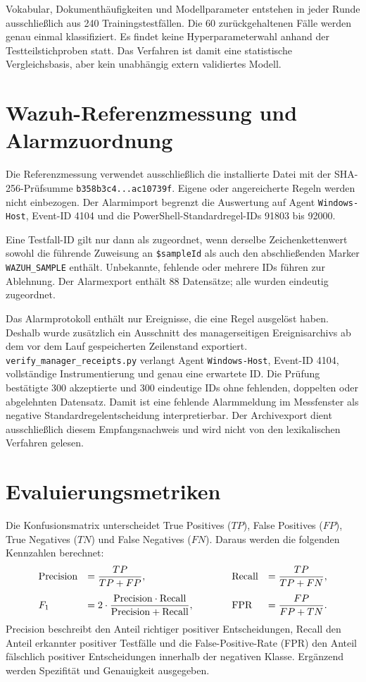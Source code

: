\documentclass[12pt,a4paper,oneside,parskip=half]{scrreprt}
\begin{document}
Vokabular, Dokumenthäufigkeiten und Modellparameter entstehen in jeder Runde ausschließlich aus 240 Trainingstestfällen. Die 60 zurückgehaltenen Fälle werden genau einmal klassifiziert. Es findet keine Hyperparameterwahl anhand der Testteilstichproben statt. Das Verfahren ist damit eine statistische Vergleichsbasis, aber kein unabhängig extern validiertes Modell.
\section{Wazuh-Referenzmessung und Alarmzuordnung}
Die Referenzmessung verwendet ausschließlich die installierte Datei  mit der SHA-256-Prüfsumme \texttt{b358b3c4...ac10739f}. Eigene oder angereicherte Regeln werden nicht einbezogen. Der Alarmimport begrenzt die Auswertung auf Agent \texttt{Windows-Host}, Event-ID 4104 und die PowerShell-Standardregel-IDs 91803 bis 92000.

Eine Testfall-ID gilt nur dann als zugeordnet, wenn derselbe Zeichenkettenwert sowohl die führende Zuweisung an \texttt{\$sampleId} als auch den abschließenden Marker \texttt{WAZUH\_SAMPLE} enthält. Unbekannte, fehlende oder mehrere IDs führen zur Ablehnung. Der Alarmexport enthält 88 Datensätze; alle wurden eindeutig zugeordnet.

Das Alarmprotokoll enthält nur Ereignisse, die eine Regel ausgelöst haben. Deshalb wurde zusätzlich ein Ausschnitt des managerseitigen Ereignisarchivs ab dem vor dem Lauf gespeicherten Zeilenstand exportiert. \texttt{verify\_manager\_receipts.py} verlangt Agent \texttt{Windows-Host}, Event-ID 4104, vollständige Instrumentierung und genau eine erwartete ID. Die Prüfung bestätigte 300 akzeptierte und 300 eindeutige IDs ohne fehlenden, doppelten oder abgelehnten Datensatz. Damit ist eine fehlende Alarmmeldung im Messfenster als negative Standardregelentscheidung interpretierbar. Der Archivexport dient ausschließlich diesem Empfangsnachweis und wird nicht von den lexikalischen Verfahren gelesen.
\section{Evaluierungsmetriken}
Die Konfusionsmatrix unterscheidet True Positives (\(TP\)), False Positives (\(FP\)), True Negatives (\(TN\)) und False Negatives (\(FN\)). Daraus werden die folgenden Kennzahlen berechnet:
\[
\begin{array}{@{}ll@{\qquad\qquad}ll@{}}
\mathrm{Precision} & \displaystyle = \frac{TP}{TP+FP}, &
\mathrm{Recall} & \displaystyle = \frac{TP}{TP+FN},\\[1.2em]
F_1 & \displaystyle = 2\cdot
\frac{\mathrm{Precision}\cdot\mathrm{Recall}}
{\mathrm{Precision}+\mathrm{Recall}}, &
\mathrm{FPR} & \displaystyle = \frac{FP}{FP+TN}.
\end{array}
\]
Precision beschreibt den Anteil richtiger positiver Entscheidungen, Recall den Anteil erkannter positiver Testfälle und die False-Positive-Rate (FPR) den Anteil fälschlich positiver Entscheidungen innerhalb der negativen Klasse. Ergänzend werden Spezifität und Genauigkeit ausgegeben.
\end{document}
